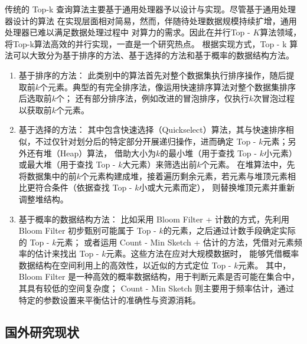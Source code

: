 传统的 Top-k 查询算法主要基于通用处理器予以设计与实现。尽管基于通用处理器设计的算法
在实现层面相对简易，然而，伴随待处理数据规模持续扩增，通用处理器已难以满足数据处理过程中
对算力的需求。因此在并行Top - $K$算法领域，将Top-k算法高效的并行实现，一直是一个研究热点。
根据实现方式，Top - k 算法可以大致分为基于排序的方法、基于选择的方法和基于概率的数据结构方法\cite{baidu2024topk}。
\begin{enumerate}
\item{基于排序的方法}：
此类别中的算法首先对整个数据集执行排序操作，随后提取前\(k\)个元素。典型的有完全排序法，像运用快速排序算法对整个数据集排序后选取前\(k\)个；
还有部分排序法，例如改进的冒泡排序，仅执行\(k\)次冒泡过程以获取前\(k\)个元素\cite{sedgewick1978implementing}。

\item{基于选择的方法}：
其中包含快速选择（Quickselect）算法，其与快速排序相似，不过仅针对划分后的特定部分开展递归操作，进而确定 Top - \(k\)元素\cite{martinez2001optimal}；另外还有堆（Heap）算法，
借助大小为\(k\)的最小堆（用于查找 Top - \(k\)小元素）或最大堆（用于查找 Top - \(k\)大元素）来筛选出前\(k\)个元素。
在堆算法中，先将数据集中的前\(k\)个元素构建成堆，接着遍历剩余元素，若元素与堆顶元素相比更符合条件（依据查找 Top - \(k\)小或大元素而定），
则替换堆顶元素并重新调整堆结构。

\item{基于概率的数据结构方法}：
比如采用 Bloom Filter + 计数的方式，先利用 Bloom Filter 初步甄别可能属于 Top - \(k\)的元素，之后通过计数手段确定实际的 Top - \(k\)元素；
或者运用 Count - Min Sketch + 估计的方法，凭借对元素频率的估计来找出 Top - \(k\)元素。这些方法在应对大规模数据时，
能够凭借概率数据结构在空间利用上的高效性，以近似的方式定位 Top - \(k\)元素。
其中，Bloom Filter 是一种高效的概率数据结构，用于判断元素是否可能在集合中，其具有较低的空间复杂度\cite{luo2018optimizing}；
Count - Min Sketch 则主要用于频率估计，通过特定的参数设置来平衡估计的准确性与资源消耗\cite{cormode2005improved}。 
\end{enumerate}

\subsection{国外研究现状}


